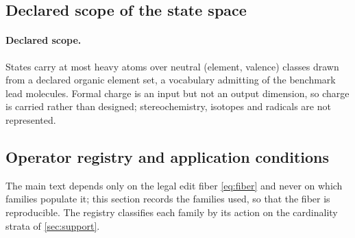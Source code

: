 \subsection{Declared scope of the state space}

\paragraph{Declared scope.}
States carry at most \XXX{} heavy atoms over \XXX{} neutral (element, valence) classes drawn from a declared organic element set, a vocabulary admitting \XXX{} of the benchmark lead molecules.
Formal charge is an input but not an output dimension, so charge is carried rather than designed; stereochemistry, isotopes and radicals are not represented.

\subsection{Operator registry and application conditions}
\label{app:operators}

The main text depends only on the legal edit fiber \eqref{eq:fiber} and never on which families populate it; this section records the families used, so that the fiber is reproducible. The registry classifies each family by its action on the cardinality strata of \cref{sec:support}.

